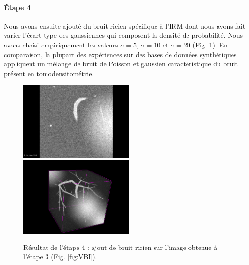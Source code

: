 \paragraph{Étape 4}
Nous avons ensuite ajouté du bruit ricien spécifique à l'IRM dont nous avons fait varier l'écart-type des gaussiennes qui composent la densité de probabilité. Nous avons choisi empiriquement les valeurs $\sigma=5$, $\sigma=10$ et $\sigma=20$ (Fig. \ref{fig:VBIR}). En comparaison, la plupart des expériences sur des bases de données synthétiques appliquent un mélange de bruit de Poisson et gaussien caractéristique du bruit présent en tomodensitométrie.
\begin{figure}[!ht]
  \centering
  \includegraphics[height=4cm]{Images/2D_VBIR10.png}
  \includegraphics[height=4cm]{Images/3D_VBIR10.png}
  \caption{Résultat de l'étape 4 : ajout de bruit ricien sur l'image obtenue à l'étape 3 (Fig. \ref{fig:VBI}).}
  \label{fig:VBIR}
\end{figure}
